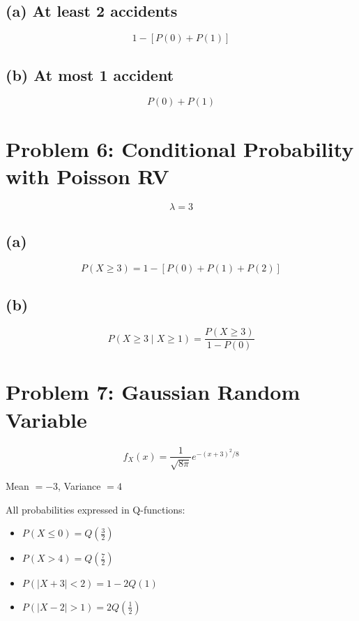 \documentclass[11pt]{article}
\begin{document}
\subsection*{(a) At least 2 accidents}

\[
1 - [P(0) + P(1)]
\]

\subsection*{(b) At most 1 accident}

\[
P(0) + P(1)
\]

\newpage

\section*{Problem 6: Conditional Probability with Poisson RV}

\[
\lambda = 3
\]

\subsection*{(a)}

\[
P(X \ge 3) = 1 - [P(0)+P(1)+P(2)]
\]

\subsection*{(b)}

\[
P(X \ge 3 \mid X \ge 1)
=
\frac{P(X \ge 3)}{1 - P(0)}
\]

\newpage

\section*{Problem 7: Gaussian Random Variable}

\[
f_X(x)=\frac{1}{\sqrt{8\pi}} e^{-(x+3)^2/8}
\]

Mean $=-3$, Variance $=4$

All probabilities expressed in Q-functions:

\begin{itemize}
    \item $P(X \le 0) = Q\left(\frac{3}{2}\right)$
    \item $P(X>4)=Q\left(\frac{7}{2}\right)$
    \item $P(|X+3|<2)=1-2Q(1)$
    \item $P(|X-2|>1)=2Q\left(\frac{1}{2}\right)$
\end{itemize}
\end{document}
